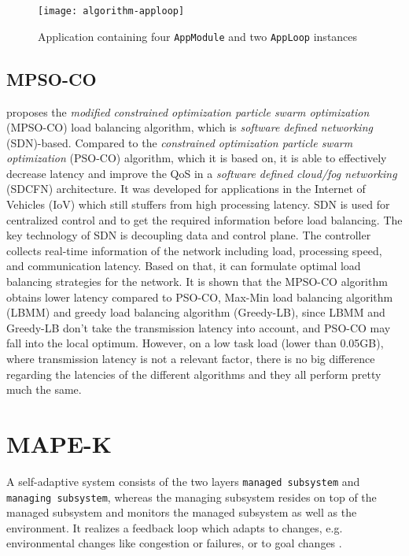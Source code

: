 \begin{figure}
    \centering
    \texttt{[image: algorithm-apploop]}
    \caption{Application containing four \texttt{AppModule} and two \texttt{AppLoop} instances}
    \label{fig:apploop}
\end{figure}

\subsection{MPSO-CO}

\cite{novel-load-balancing} proposes the \textit{modified constrained optimization particle swarm optimization} (MPSO-CO) load balancing algorithm, which is \textit{software defined networking} (SDN)-based. Compared to the \textit{constrained optimization particle swarm optimization} (PSO-CO) algorithm, which it is based on, it is able to effectively decrease latency and improve the QoS in a \textit{software defined cloud/fog networking} (SDCFN) architecture. It was developed for applications in the Internet of Vehicles (IoV) which still stuffers from high processing latency. SDN is used for centralized control and to get the required information before load balancing. The key technology of SDN is decoupling data and control plane. The controller collects real-time information of the network including load, processing speed, and communication latency. Based on that, it can formulate optimal load balancing strategies for the network. It is shown that the MPSO-CO algorithm obtains lower latency compared to PSO-CO, Max-Min load balancing algorithm (LBMM) and greedy load balancing algorithm (Greedy-LB), since LBMM and Greedy-LB don’t take the transmission latency into account, and PSO-CO may fall into the local optimum. However, on a low task load (lower than 0.05GB), where transmission latency is not a relevant factor, there is no big difference regarding the latencies of the different algorithms and they all perform pretty much the same.

\section{MAPE-K}
A self-adaptive system consists of the two layers \texttt{managed subsystem} and \texttt{managing subsystem}, whereas the managing subsystem resides on top of the managed subsystem and monitors the managed subsystem as well as the environment. It realizes a feedback loop which adapts to changes, e.g. environmental changes like congestion or failures, or to goal changes \cite{mape-k}.\\

